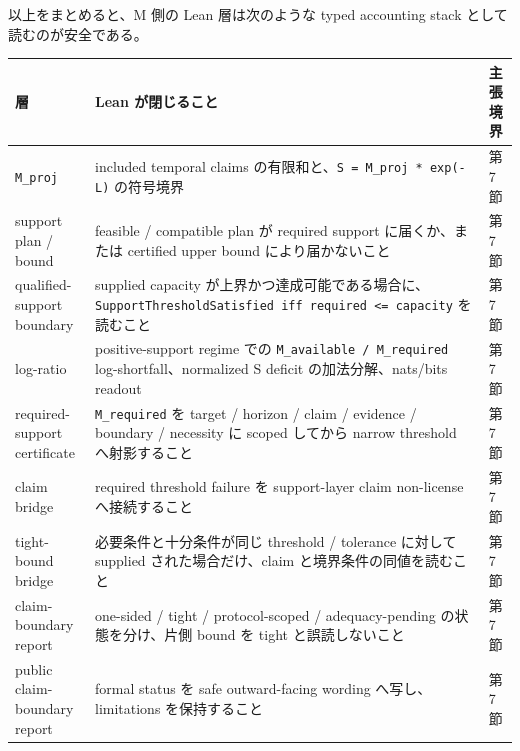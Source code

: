 \documentclass[12pt,a4paper]{article}
\begin{document}
以上をまとめると、M 側の Lean 層は次のような typed accounting stack として読むのが安全である。

{\def\LTcaptype{table} %
\begin{longtable}[]{@{}
  >{\raggedright\arraybackslash}p{}
  >{\raggedright\arraybackslash}p{}
  >{\raggedright\arraybackslash}p{}@{}}
\toprule\noalign{}
\begin{minipage}[b]{\linewidth}\raggedright
層
\end{minipage} & \begin{minipage}[b]{\linewidth}\raggedright
Lean が閉じること
\end{minipage} & \begin{minipage}[b]{\linewidth}\raggedright
主張境界
\end{minipage} \\
\midrule\noalign{}
\endhead
\bottomrule\noalign{}
\endlastfoot
\texttt{M\_proj} & included temporal claims の有限和と、\texttt{S\ =\ M\_proj\ *\ exp(-L)} の符号境界 & 第7節 \\
support plan / bound & feasible / compatible plan が required support に届くか、または certified upper bound により届かないこと & 第7節 \\
qualified-support boundary & supplied capacity が上界かつ達成可能である場合に、\texttt{SupportThresholdSatisfied\ iff\ required\ \textless{}=\ capacity} を読むこと & 第7節 \\
log-ratio & positive-support regime での \texttt{M\_available\ /\ M\_required} log-shortfall、normalized S deficit の加法分解、nats/bits readout & 第7節 \\
required-support certificate & \texttt{M\_required} を target / horizon / claim / evidence / boundary / necessity に scoped してから narrow threshold へ射影すること & 第7節 \\
claim bridge & required threshold failure を support-layer claim non-license へ接続すること & 第7節 \\
tight-bound bridge & 必要条件と十分条件が同じ threshold / tolerance に対して supplied された場合だけ、claim と境界条件の同値を読むこと & 第7節 \\
claim-boundary report & one-sided / tight / protocol-scoped / adequacy-pending の状態を分け、片側 bound を tight と誤読しないこと & 第7節 \\
public claim-boundary report & formal status を safe outward-facing wording へ写し、limitations を保持すること & 第7節 \\

\end{longtable}}
\end{document}
